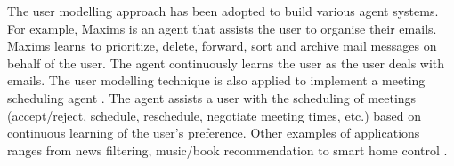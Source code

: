 The user modelling approach has been adopted to build various agent systems. For example, Maxims \citep{Metral1998} is an agent that assists the user to organise their emails. Maxims learns to prioritize, delete, forward, sort and archive mail messages on behalf of the user. The agent continuously learns the user as the user deals with emails. The user modelling technique is also applied to implement a meeting scheduling agent \citep{Kozierok1993}. The agent assists a user with the scheduling of meetings (accept/reject, schedule, reschedule, negotiate meeting times, etc.) based on continuous learning of the user's preference. Other examples of applications ranges from news filtering, music/book recommendation \citep{Lieberman2003} to smart home control \citep{Costanza2014}.




